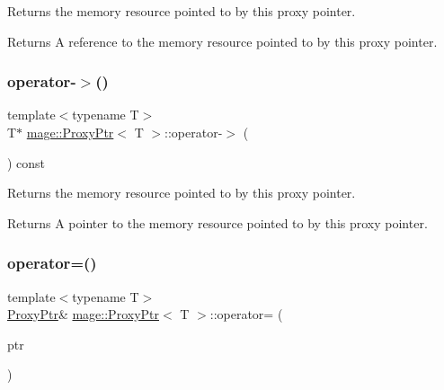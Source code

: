 Returns the memory resource pointed to by this proxy pointer.

\begin{DoxyReturn}{Returns}
A reference to the memory resource pointed to by this proxy pointer. 
\end{DoxyReturn}
\hypertarget{classmage_1_1_proxy_ptr_af33f20a43615df2328d7436ff3145d54}{}\label{classmage_1_1_proxy_ptr_af33f20a43615df2328d7436ff3145d54} 
\subsubsection{\texorpdfstring{operator-\/$>$()}{operator->()}}
{\footnotesize\ttfamily template$<$typename T$>$ \\
T$\ast$ \hyperlink{classmage_1_1_proxy_ptr}{mage\+::\+Proxy\+Ptr}$<$ T $>$\+::operator-\/$>$ (\begin{DoxyParamCaption}{ }\end{DoxyParamCaption}) const\hspace{0.3cm}{\ttfamily [noexcept]}}

Returns the memory resource pointed to by this proxy pointer.

\begin{DoxyReturn}{Returns}
A pointer to the memory resource pointed to by this proxy pointer. 
\end{DoxyReturn}
\hypertarget{classmage_1_1_proxy_ptr_a2d3a3a7595028a72a97a2c2131947a8d}{}\label{classmage_1_1_proxy_ptr_a2d3a3a7595028a72a97a2c2131947a8d} 
\subsubsection{\texorpdfstring{operator=()}{operator=()}\hspace{0.1cm}{\footnotesize\ttfamily [1/2]}}
{\footnotesize\ttfamily template$<$typename T$>$ \\
\hyperlink{classmage_1_1_proxy_ptr}{Proxy\+Ptr}\& \hyperlink{classmage_1_1_proxy_ptr}{mage\+::\+Proxy\+Ptr}$<$ T $>$\+::operator= (\begin{DoxyParamCaption}\item[{const \hyperlink{classmage_1_1_proxy_ptr}{Proxy\+Ptr}$<$ T $>$ \&}]{ptr }\end{DoxyParamCaption})\hspace{0.3cm}{\ttfamily [noexcept]}}

